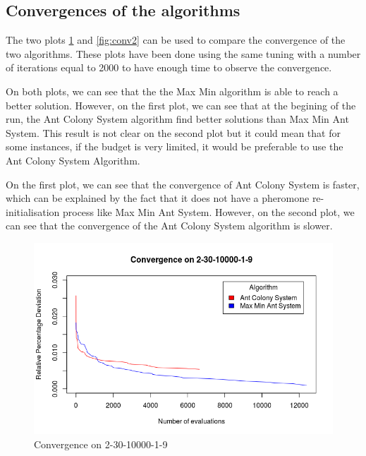 \documentclass{article}
\begin{document}
\subsection{Convergences of the algorithms}

The two plots \ref{fig:conv1} and \ref{fig:conv2} can be used to compare the convergence of the two algorithms.
These plots have been done using the same tuning with a number of iterations equal to 2000 to have enough time to observe the convergence.\newline

On both plots, we can see that the the Max Min algorithm is able to reach a better solution.
However, on the first plot, we can see that at the begining of the run, the Ant Colony System algorithm find better solutions than Max Min Ant System.
This result is not clear on the second plot but it could mean that for some instances, if the budget is very limited, it would be preferable to use the Ant Colony System Algorithm. \newline

On the first plot, we can see that the convergence of Ant Colony System is faster, which can be explained by the fact that it does not have a pheromone re-initialisation process like Max Min Ant System.
However, on the second plot, we can see that the convergence of the Ant Colony System algorithm is slower.

\begin{figure}
    \centering
        \includegraphics[scale=0.5]{conv-2-30}
    \caption{Convergence on 2-30-10000-1-9}
    \label{fig:conv1}
\end{figure}
\end{document}
